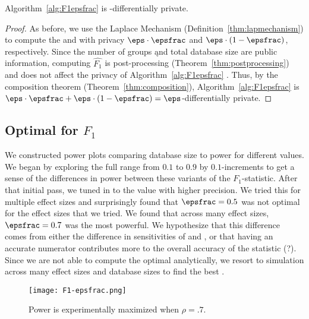 \begin{theorem}
Algorithm~\ref{alg:F1epsfrac} is \eps -differentially private.
\end{theorem}
\begin{proof}
As before, we use the Laplace Mechanism (Definition~\ref{thm:lapmechanism}) to compute the \sa and \se with privacy $\eps\cdot\epsfrac$ and $\eps\cdot(1-\epsfrac)$, respectively. Since the number of groups \k and total database size \dbsize are public information, computing $\widehat{F_1}$ is post-processing (Theorem~\ref{thm:postprocessing}) and does not affect the privacy of Algorithm~\ref{alg:F1epsfrac} . Thus, by the composition theorem (Theorem~\ref{thm:composition}), Algorithm~\ref{alg:F1epsfrac} is $\eps\cdot\epsfrac + \eps\cdot(1-\epsfrac) = \eps$-differentially private.
\end{proof}

\subsection{Optimal \epsfrac for $F_{1}$}
We constructed power plots comparing database size to power for different \epsfrac values. We began by exploring the full range from $0.1$ to $0.9$ by $0.1$-increments to get a sense of the differences in power between these variants of the $F_1$-statistic. After that initial pass, we tuned in to the value with higher precision. We tried this for multiple effect sizes and surprisingly found that $\epsfrac = 0.5$ was not optimal for the effect sizes that we tried.  We found that across many effect sizes, $\epsfrac = 0.7$ was the most powerful. We hypothesize that this difference comes from  either the difference in sensitivities of \sa and \se, or that having an accurate numerator contributes more to the overall accuracy of the statistic (?).    Since we are not able to compute the optimal \epsfrac analytically, we resort to simulation across many effect sizes and database sizes to find the best \epsfrac.
\begin{figure}
\centering
\texttt{[image: F1-epsfrac.png]}
\caption{Power is experimentally maximized when $\rho = .7$.}
\end{figure}
 
